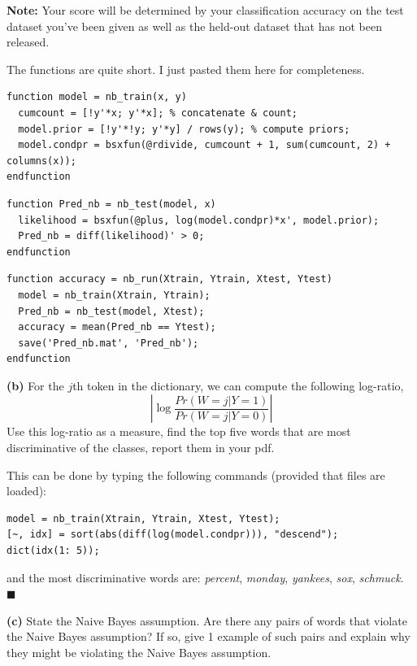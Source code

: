 \documentclass[11pt]{article}
\newcounter{marks}
\def\maxmarks#1{\extramark{#1}\addtocounter{marks}{#1}}
\def\extramark#1{
  \begin{flushright}
  [\emph{#1 points}]
  \end{flushright}
}
\renewcommand{\part}[1] {\vspace{.10in} {\bf (#1)}}
\begin{document}
\textbf{Note:} Your score will be determined by your classification 
accuracy on the test dataset you've been given as well as the held-out 
dataset that has not been released.

\lstset{
  numbers = left,
  language = Octave,
  basicstyle = \small,
  keywordstyle = \bfseries,  
}

{\color{blue} The functions are quite short. I just pasted them here for completeness.
\begin{lstlisting}
function model = nb_train(x, y)
  cumcount = [!y'*x; y'*x]; % concatenate & count; 
  model.prior = [!y'*!y; y'*y] / rows(y); % compute priors; 
  model.condpr = bsxfun(@rdivide, cumcount + 1, sum(cumcount, 2) + columns(x));
endfunction
\end{lstlisting}
\begin{lstlisting}
function Pred_nb = nb_test(model, x)
  likelihood = bsxfun(@plus, log(model.condpr)*x', model.prior);
  Pred_nb = diff(likelihood)' > 0;
endfunction
\end{lstlisting}
\begin{lstlisting}
function accuracy = nb_run(Xtrain, Ytrain, Xtest, Ytest)
  model = nb_train(Xtrain, Ytrain);
  Pred_nb = nb_test(model, Xtest);
  accuracy = mean(Pred_nb == Ytest);
  save('Pred_nb.mat', 'Pred_nb');
endfunction
\end{lstlisting}
}

\maxmarks{15}
\part{b} For the $j$th token in the dictionary, we can compute the following log-ratio,
\[
\left |\log \frac{Pr(W = j | Y = 1) }{Pr(W = j | Y = 0)} \right|
\]
Use this log-ratio as a measure, find the top five words that are most 
discriminative of the classes, report them in your pdf. 
\maxmarks{5} 

{\color{blue} This can be done by typing the following commands (provided that files are loaded):
\begin{lstlisting}
model = nb_train(Xtrain, Ytrain, Xtest, Ytest); 
[~, idx] = sort(abs(diff(log(model.condpr))), "descend");
dict(idx(1: 5)); 
\end{lstlisting} 
and the most discriminative words are: {\it percent}, {\it monday}, {\it yankees}, {\it sox}, {\it schmuck}. {\hfill$\blacksquare$}}

\part{c}  State the Naive Bayes assumption. 
Are there any pairs of words that violate the Naive Bayes assumption? 
If so, give 1 example of such pairs and explain why they might be 
violating the Naive Bayes assumption. 
\maxmarks{5}
\end{document}

